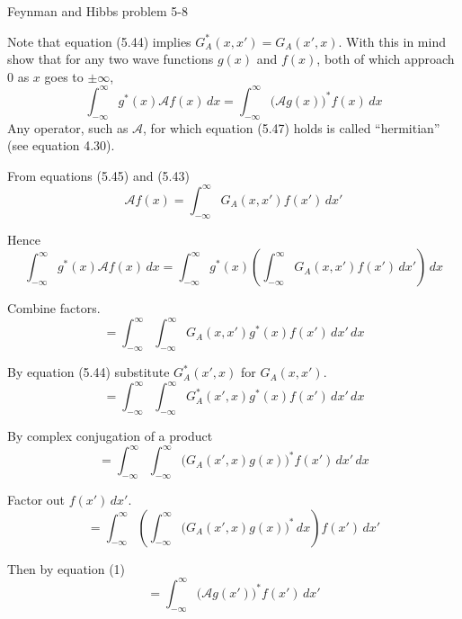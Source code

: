 \documentclass[12pt]{article}
\begin{document}
\begin{center}
Feynman and Hibbs problem 5-8
\end{center}

Note that equation (5.44) implies $G_A^*(x,x')=G_A(x',x)$.
With this in mind show that for any two wave functions
$g(x)$ and $f(x)$, both of which approach 0 as $x$ goes to $\pm\infty$,
\begin{equation*}
\int_{-\infty}^\infty
g^*(x)\mathcal Af(x)\,dx=
\int_{-\infty}^\infty
\big(\mathcal Ag(x)\big)^*f(x)\,dx
\tag{5.47}
\end{equation*}
Any operator, such as $\mathcal A$, for which equation (5.47)
holds is called ``hermitian'' (see equation 4.30).

\bigskip
From equations (5.45) and (5.43)
\begin{equation*}
\mathcal Af(x)=\int_{-\infty}^\infty G_A(x,x')f(x')\,dx'
\tag{1}
\end{equation*}

Hence
\begin{equation*}
\int_{-\infty}^\infty g^*(x)\mathcal Af(x)\,dx
=\int_{-\infty}^\infty g^*(x)
\left(\int_{-\infty}^\infty G_A(x,x')f(x')\,dx'\right)
\,dx
\end{equation*}

Combine factors.
\begin{equation*}
{}=\int_{-\infty}^\infty
\int_{-\infty}^\infty G_A(x,x')g^*(x)f(x')\,dx'
\,dx
\end{equation*}

By equation (5.44) substitute $G_A^*(x',x)$ for $G_A(x,x')$.
\begin{equation*}
{}=\int_{-\infty}^\infty
\int_{-\infty}^\infty G_A^*(x',x)g^*(x)f(x')\,dx'
\,dx
\end{equation*}

By complex conjugation of a product
\begin{equation*}
{}=\int_{-\infty}^\infty
\int_{-\infty}^\infty\big(G_A(x',x)g(x)\big)^*f(x')\,dx'
\,dx
\end{equation*}

Factor out $f(x')\,dx'$.
\begin{equation*}
{}=\int_{-\infty}^\infty
\left(\int_{-\infty}^\infty\big(G_A(x',x)g(x)\big)^*\,dx\right)f(x')\,dx'
\end{equation*}

Then by equation (1)
\begin{equation*}
{}=\int_{-\infty}^\infty\big(\mathcal Ag(x')\big)^*f(x')\,dx'
\end{equation*}
\end{document}
